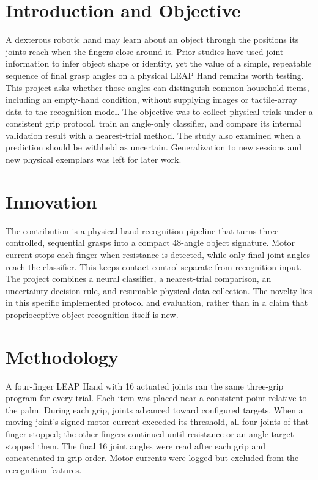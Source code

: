 \documentclass[11pt,a4paper]{article}
\begin{document}
\section*{Introduction and Objective}

A dexterous robotic hand may learn about an object through the positions its joints reach when the fingers close around it. Prior studies have used joint information to infer object shape or identity, yet the value of a simple, repeatable sequence of final grasp angles on a physical LEAP Hand remains worth testing. This project asks whether those angles can distinguish common household items, including an empty-hand condition, without supplying images or tactile-array data to the recognition model. The objective was to collect physical trials under a consistent grip protocol, train an angle-only classifier, and compare its internal validation result with a nearest-trial method. The study also examined when a prediction should be withheld as uncertain. Generalization to new sessions and new physical exemplars was left for later work.

\section*{Innovation}

The contribution is a physical-hand recognition pipeline that turns three controlled, sequential grasps into a compact 48-angle object signature. Motor current stops each finger when resistance is detected, while only final joint angles reach the classifier. This keeps contact control separate from recognition input. The project combines a neural classifier, a nearest-trial comparison, an uncertainty decision rule, and resumable physical-data collection. The novelty lies in this specific implemented protocol and evaluation, rather than in a claim that proprioceptive object recognition itself is new.

\newpage

\section*{Methodology}

A four-finger LEAP Hand with 16 actuated joints ran the same three-grip program for every trial. Each item was placed near a consistent point relative to the palm. During each grip, joints advanced toward configured targets. When a moving joint's signed motor current exceeded its threshold, all four joints of that finger stopped; the other fingers continued until resistance or an angle target stopped them. The final 16 joint angles were read after each grip and concatenated in grip order. Motor currents were logged but excluded from the recognition features.
\end{document}

